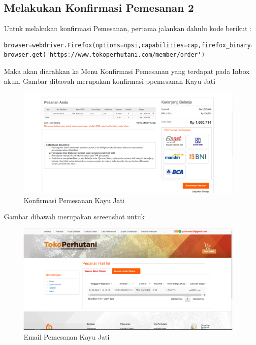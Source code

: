\newpage
\subsection {Melakukan Konfirmasi Pemesanan 2}
Untuk melakukan konfirmasi Pemesanan, pertama jalankan dahulu kode berikut :
\begin{verbatim}
browser=webdriver.Firefox(options=opsi,capabilities=cap,firefox_binary=binary)
browser.get('https://www.tokoperhutani.com/member/order')
\end{verbatim}

Maka akan diarahkan ke Menu Konfirmasi Pemesanan yang terdapat pada Inbox akun.
Gambar dibawah merupakan konfirmasi ppemesanan Kayu Jati
\begin{figure}[h]
	\centering
	\includegraphics[scale=0.25]{figures/T6_1}
	\caption{Konfirmasi Pemesanan Kayu Jati}
\end{figure}

Gambar dibawah merupakan screenshot untuk
\begin{figure}[h]
	\centering
	\includegraphics[scale=0.25]{figures/T6_2}
	\caption{Email Pemesanan Kayu Jati}
\end{figure}
